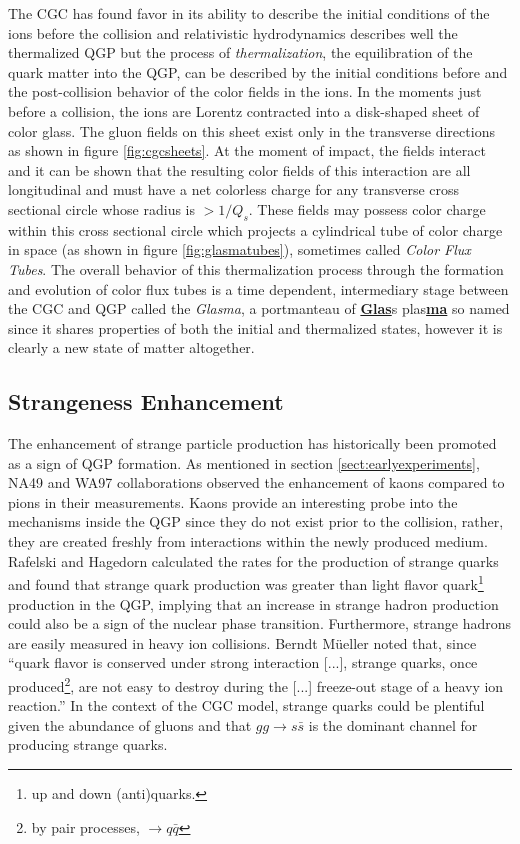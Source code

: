 The CGC has found favor in its ability to describe the initial conditions of the ions before the collision and relativistic hydrodynamics describes well the thermalized QGP but the process of \textit{thermalization}, the equilibration of the quark matter into the QGP, can be described by the initial conditions before and the post-collision behavior of the color fields in the ions\citep{Fujii:2008dd}. In the moments just before a collision, the ions are Lorentz contracted into a disk-shaped sheet of color glass. The gluon fields on this sheet exist only in the transverse directions as shown in figure \ref{fig:cgcsheets}. At the moment of impact, the fields interact and it can be shown\citep{Fries:2006pv} that the resulting color fields of this interaction are all longitudinal and must have a net colorless charge for any transverse cross sectional circle whose radius is $> 1/Q_s$. These fields may possess color charge within this cross sectional circle which projects a cylindrical tube of color charge in space (as shown in figure \ref{fig:glasmatubes}), sometimes called \textit{Color Flux Tubes}. The overall behavior of this thermalization process through the formation and evolution of color flux tubes is a time dependent, intermediary stage between the CGC and QGP called the \textit{Glasma}, a portmanteau of \underline{\textbf{Glas}}s plas\underline{\textbf{ma}} so named since it shares properties of both the initial and thermalized states, however it is clearly a new state of matter altogether.

\subsection{Strangeness Enhancement}
The enhancement of strange particle production has historically been promoted as a sign of QGP formation. As mentioned in section \ref{sect:earlyexperiments}, NA49 and WA97 collaborations observed the enhancement of kaons compared to pions in their measurements. Kaons provide an interesting probe into the mechanisms inside the QGP since they do not exist prior to the collision, rather, they are created freshly from interactions within the newly produced medium. Rafelski and Hagedorn calculated the rates for the production of strange quarks\citep{statmechofquarks} and found that strange quark production was greater than light flavor quark\footnote{up and down (anti)quarks.} production in the QGP, implying that an increase in strange hadron production could also be a sign of the nuclear phase transition. Furthermore, strange hadrons are easily measured in heavy ion collisions. Berndt M\"ueller noted that, since ``quark flavor is conserved under strong interaction [...], strange quarks, once produced\footnote{by pair processes, $\rightarrow q\bar{q}$}, are not easy to destroy during the [...] freeze-out stage of a heavy ion reaction.''\citep{Muller:2011tu} In the context of the CGC model, strange quarks could be plentiful given the abundance of gluons and that $gg \rightarrow s \bar{s}$ is the dominant channel for producing strange quarks\citep{PhysRevLett.48.1066}.

